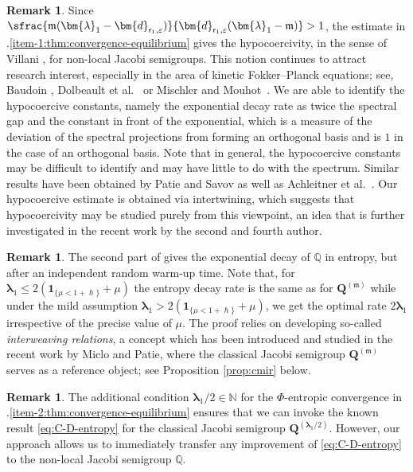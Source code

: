 \documentclass[10pt]{amsart}
\let\epsilon\varepsilon
\theoremstyle{plain}
\theoremstyle{definition}
\newtheorem{remark}[theorem]{Remark}
\newcommand{\N}{\mathbb{N}}
\newcommand{\J}{\mathds{Q}}
\newcommand{\m}{\mathfrak{m}}
\newcommand{\dpt}{\bm{d}_{\vat,\epsilon}}
\newcommand{\lam}{{\bm{\lambda}_1}}
\newcommand{\vat}{{\mathsf{r}_1}}
\newcommand{\Q}[1][\mo]{\mathbf{Q}^{({#1})}}
\let\h\hslash
\let\mo\mu
\begin{document}
\begin{remark}
Since $\sfrac{\m(\lam-\dpt)}{\dpt(\lam-\m)} > 1$, the estimate in .\eqref{item-1:thm:convergence-equilibrium} gives the hypocoercivity, in the sense of Villani \cite{Villani-09}, for non-local Jacobi semigroups. This notion continues to attract research interest, especially in the area of kinetic Fokker--Planck equations; see, \eg Baudoin \cite{Baudoin}, Dolbeault et al.~\cite{Mouhot} or Mischler and Mouhot~\cite{Mischler2016}. We are able to identify the hypocoercive constants, namely the exponential decay rate as twice the spectral gap and the constant in front of the exponential, which is a measure of the deviation of the spectral projections from forming an orthogonal basis and is $1$ in the case of an orthogonal basis. Note that in general, the hypocoercive constants may be difficult to identify and may have little to do with the spectrum. Similar results have been obtained by Patie and Savov \cite{Patie-Savov-GeL} as well as Achleitner et al.~\cite{BGK}. Our hypocoercive estimate is obtained via intertwining, which suggests that hypocoercivity may be studied purely from this viewpoint, an idea that is further investigated in the recent work \cite{PV-Hypo} by the second and fourth author.
\end{remark}

\begin{remark}
The second part of  gives the exponential decay of $\J$ in entropy, but after an independent random warm-up time. Note that, for $\lam \leq 2(\bm{1}_{\{\mo < 1+\h \}} + \mo)$ the entropy decay rate is the same as for $\Q[\m]$ while under the mild assumption $\lam > 2(\bm{1}_{\{\mo < 1+\h \}} + \mo)$, we get the optimal rate $2 \lam$
irrespective of the precise value of $\mo$. The proof relies on developing so-called \emph{interweaving relations}, a concept which has been introduced and studied in the recent work \cite{Patie-Miclo} by Miclo and Patie, where the classical Jacobi semigroup $\Q[\m]$ serves as a reference object; see Proposition \ref{prop:cmir} below.
\end{remark}

\begin{remark}
The additional condition $\lam/2 \in \N$ for the $\Phi$-entropic convergence in .\eqref{item-2:thm:convergence-equilibrium} ensures that we can invoke the known result \eqref{eq:C-D-entropy} for the classical Jacobi semigroup $\Q[\lam/2]$. However, our approach allows us to immediately transfer any improvement of \eqref{eq:C-D-entropy} to the non-local Jacobi semigroup $\J$.
\end{remark}
\end{document}
